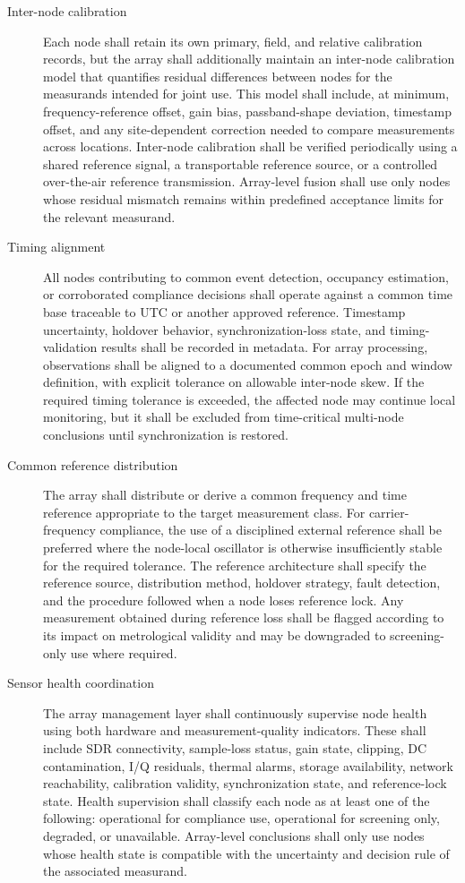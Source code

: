 \documentclass[11pt]{article}
\begin{document}
\begin{description}

\item[Inter-node calibration] Each node shall retain its own primary, field, and relative calibration records, but the array shall additionally maintain an inter-node calibration model that quantifies residual differences between nodes for the measurands intended for joint use. This model shall include, at minimum, frequency-reference offset, gain bias, passband-shape deviation, timestamp offset, and any site-dependent correction needed to compare measurements across locations. Inter-node calibration shall be verified periodically using a shared reference signal, a transportable reference source, or a controlled over-the-air reference transmission. Array-level fusion shall use only nodes whose residual mismatch remains within predefined acceptance limits for the relevant measurand.

\item[Timing alignment] All nodes contributing to common event detection, occupancy estimation, or corroborated compliance decisions shall operate against a common time base traceable to UTC or another approved reference. Timestamp uncertainty, holdover behavior, synchronization-loss state, and timing-validation results shall be recorded in metadata. For array processing, observations shall be aligned to a documented common epoch and window definition, with explicit tolerance on allowable inter-node skew. If the required timing tolerance is exceeded, the affected node may continue local monitoring, but it shall be excluded from time-critical multi-node conclusions until synchronization is restored.

\item[Common reference distribution] The array shall distribute or derive a common frequency and time reference appropriate to the target measurement class. For carrier-frequency compliance, the use of a disciplined external reference shall be preferred where the node-local oscillator is otherwise insufficiently stable for the required tolerance. The reference architecture shall specify the reference source, distribution method, holdover strategy, fault detection, and the procedure followed when a node loses reference lock. Any measurement obtained during reference loss shall be flagged according to its impact on metrological validity and may be downgraded to screening-only use where required.

\item[Sensor health coordination] The array management layer shall continuously supervise node health using both hardware and measurement-quality indicators. These shall include SDR connectivity, sample-loss status, gain state, clipping, DC contamination, I/Q residuals, thermal alarms, storage availability, network reachability, calibration validity, synchronization state, and reference-lock state. Health supervision shall classify each node as at least one of the following: operational for compliance use, operational for screening only, degraded, or unavailable. Array-level conclusions shall only use nodes whose health state is compatible with the uncertainty and decision rule of the associated measurand.


\end{description}
\end{document}
